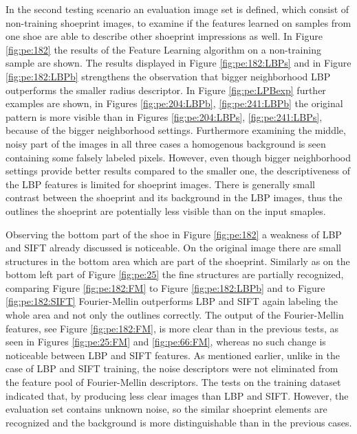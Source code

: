 \documentclass[draft,final]{vutinfth} %
\begin{document}
\par
In the second testing scenario an evaluation image set is defined, which consist of non-training shoeprint images, to examine if the features learned on samples from one shoe are able to describe other shoeprint impressions as well.
In Figure \ref{fig:pe:182} the results of the Feature Learning algorithm on a non-training sample are shown.
The results displayed in Figure \ref{fig:pe:182:LBPs} and in Figure \ref{fig:pe:182:LBPb} strengthens the observation that bigger neighborhood LBP outperforms the smaller radius descriptor.
In Figure \ref{fig:pe:LPBexp} further examples are shown, in Figures \ref{fig:pe:204:LBPb}, \ref{fig:pe:241:LBPb} the original pattern is more visible than in Figures \ref{fig:pe:204:LBPs}, \ref{fig:pe:241:LBPs}, because of the bigger neighborhood settings.
Furthermore examining the middle, noisy part of the images in all three cases a homogenous background is seen containing some falsely labeled pixels.
However, even though bigger neighborhood settings provide better results compared to the smaller one, the descriptiveness of the LBP features is limited for shoeprint images.
There is generally small contrast between the shoeprint and its background in the LBP images, thus the outlines the shoeprint are potentially less visible than on the input smaples.
\par
Observing the bottom part of the shoe in Figure \ref{fig:pe:182} a weakness of LBP and SIFT already discussed is noticeable.
On the original image there are small structures in the bottom area which are part of the shoeprint.
Similarly as on the bottom left part of Figure \ref{fig:pe:25} the fine structures are partially recognized, comparing Figure \ref{fig:pe:182:FM} to Figure \ref{fig:pe:182:LBPb} and to Figure \ref{fig:pe:182:SIFT} Fourier-Mellin outperforms LBP and SIFT again labeling the whole area and not only the outlines correctly.
The output of the Fourier-Mellin features, see Figure \ref{fig:pe:182:FM}, is more clear than in the previous tests, as seen in Figures \ref{fig:pe:25:FM} and \ref{fig:pe:66:FM}, whereas no such change is noticeable between LBP and SIFT features.
As mentioned earlier, unlike in the case of LBP and SIFT training, the noise descriptors were not eliminated from the feature pool of Fourier-Mellin descriptors.
The tests on the training dataset indicated that, by producing less clear images than LBP and SIFT.
However, the evaluation set contains unknown noise, so the similar shoeprint elements are recognized and the background is more distinguishable than in the previous cases.
\end{document}
